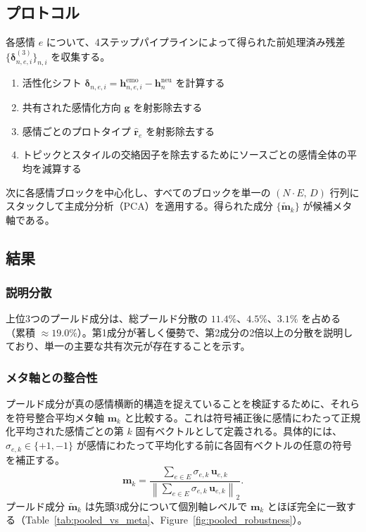 \subsection{プロトコル}

各感情 $e$ について、4ステップパイプラインによって得られた前処理済み残差 $\{\boldsymbol{\delta}^{(3)}_{n,e,i}\}_{n,i}$ を収集する。
\begin{enumerate}
  \item 活性化シフト $\boldsymbol{\delta}_{n,e,i} = \mathbf{h}^{\mathrm{emo}}_{n,e,i} - \mathbf{h}^{\mathrm{neu}}_{n}$ を計算する
  \item 共有された感情化方向 $\mathbf{g}$ を射影除去する
  \item 感情ごとのプロトタイプ $\hat{\mathbf{r}}_e$ を射影除去する
  \item トピックとスタイルの交絡因子を除去するためにソースごとの感情全体の平均を減算する
\end{enumerate}

次に各感情ブロックを中心化し、すべてのブロックを単一の $(N \cdot E,\, D)$ 行列にスタックして主成分分析（PCA）を適用する。得られた成分 $\{\tilde{\mathbf{m}}_k\}$ が候補メタ軸である。\par

\subsection{結果}

\subsubsection*{説明分散}
上位3つのプールド成分は、総プールド分散の $11.4\%$、$4.5\%$、$3.1\%$ を占める（累積 $\approx 19.0\%$）。第1成分が著しく優勢で、第2成分の2倍以上の分散を説明しており、単一の主要な共有次元が存在することを示す。\par

\subsubsection*{メタ軸との整合性}
プールド成分が真の感情横断的構造を捉えていることを検証するために、それらを符号整合平均メタ軸 $\mathbf{m}_k$ と比較する。これは符号補正後に感情にわたって正規化平均された感情ごとの第 $k$ 固有ベクトルとして定義される。具体的には、$\sigma_{e,k}\in\{+1,-1\}$ が感情にわたって平均化する前に各固有ベクトルの任意の符号を補正する。
\[
\mathbf{m}_k
=\frac{\sum_{e\in E}\sigma_{e,k}\,\mathbf{u}_{e,k}}
      {\left\lVert\sum_{e\in E}\sigma_{e,k}\,\mathbf{u}_{e,k}\right\rVert_2}.
\]
プールド成分 $\tilde{\mathbf{m}}_k$ は先頭3成分について個別軸レベルで $\mathbf{m}_k$ とほぼ完全に一致する（Table~\ref{tab:pooled_vs_meta}、Figure~\ref{fig:pooled_robustness}）。\par

